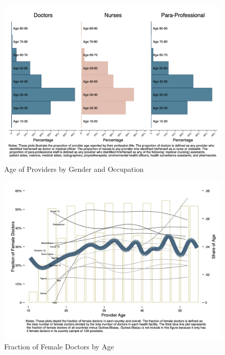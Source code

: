 \documentclass{article}                 %
\begin{document}
			\begin{figure}[H] 
				\centering
				\caption{Age of Providers by Gender and Occupation} 
				\includegraphics[width=\textwidth]{"../Output/Final/Per_providers_occ"}
			\end{figure}
		
			\begin{figure}[H] 
				\centering
				\caption{Fraction of Female Doctors by Age} 
				\includegraphics[width=\textwidth]{"../Output/Final/Line plots/med_fem_frac"}
			\end{figure}			
			
\end{document}
